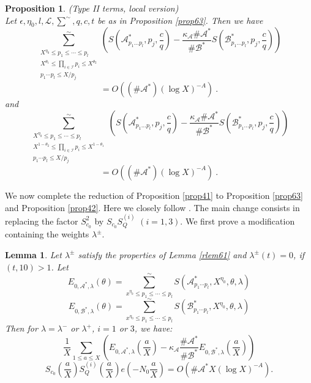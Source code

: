 \documentclass{amsart}
\newtheorem{lemma}[theorem]{Lemma}
\newtheorem{proposition}[theorem]{Proposition}
\numberwithin{equation}{subsection}
\begin{document}
\begin{proposition}\label{prop64}(Type II terms, local version)\\
Let $\epsilon, \eta_0, l, \mathcal{L}, \sum^\sim, q, c, t$ be as in Proposition \ref{prop63}. Then we have
$$\sum^\sim_{\substack{X^{\eta_0}\leq p_1\leq \cdots \leq p_l \\ X^{\theta_1}\leq \prod_{i\in \mathcal{I}} p_i\leq X^{\theta_2}\\ p_1\cdots p_l\leq X/p_j}} \left( S\left(\mathcal{A}^*_{p_1 \ldots p_l}, p_j, \frac{c}{q}\right)-\frac{\kappa_{\mathcal{A}}\#\mathcal{A}^*}{\#\mathcal{B}^*}  S\left(\mathcal{B}^*_{p_1 \ldots p_l}, p_j, \frac{c}{q}\right)  \right) $$
$$=O\left((\#\mathcal{A}^*)(\log X)^{-A}\right)\:.$$
and
$$\sum^\sim_{\substack{X^{\eta_0}\leq p_1\leq \cdots \leq p_l \\ X^{1-\theta_2}\leq \prod_{i\in \mathcal{I}} p_i\leq X^{1-\theta_1}\\ p_1\cdots p_l\leq X/p_j}} \left( S\left(\mathcal{A}^*_{p_1 \ldots p_l}, p_j, \frac{c}{q}\right)-\frac{\kappa_{\mathcal{A}}\#\mathcal{A}^*}{\#\mathcal{B}^*}  S\left(\mathcal{B}^*_{p_1 \ldots p_l}, p_j, \frac{c}{q}\right)  \right) $$
$$=O\left((\#\mathcal{A}^*)(\log X)^{-A}\right)\:.$$
\end{proposition}




We now complete the reduction of Proposition \ref{prop41} to Proposition \ref{prop63} and Proposition \ref{prop42}. Here we closely follow \cite{maier-rassias-gold}. The main change consists  in replacing the factor $S_{c_0}^2$ by $S_{c_0}S_{Q}^{(i)}$ $(i=1, 3)$. We first prove a modification containing the weights $\lambda^\pm$.




\begin{lemma}\label{rlem616}
Let $\lambda^\pm$ satisfy the properties of Lemma \ref{rlem61} and $\lambda^\pm(t)=0$, if \mbox{$(t, 10)>1$.} Let
$$E_{0, \mathcal{A}^*, \lambda}(\theta)=\sum_{x^{\eta_0}\leq p_1\leq \cdots \leq p_l}^\sim S(\mathcal{A}_{p_1\cdots p_l}^*, X^{\eta_0}, \theta, \lambda)$$
$$E_{0, \mathcal{B}^*, \lambda}(\theta)=\sum_{x^{\eta_0}\leq p_1\leq \cdots \leq p_l}^\sim S(\mathcal{B}_{p_1\cdots p_l}^*, X^{\eta_0}, \theta, \lambda)$$
Then for $\lambda=\lambda^-$ or $\lambda^+$, $i=1$ or $3$, we have:
$$\frac{1}{X}\sum_{1\leq a\leq X} \left( E_{0, \mathcal{A}^*, \lambda}\left(\frac{a}{X}\right)-\kappa_{\mathcal{A}}\frac{\#\mathcal{A}^*}{\#\mathcal{B}^*} E_{0, \mathcal{B}^*, \lambda}\left(\frac{a}{X}\right)\right)$$
$$S_{c_0}\left(\frac{a}{X}\right)S_Q^{(i)}\left(\frac{a}{X}\right)e\left(-N_0 \frac{a}{X}\right)=O\left(\# \mathcal{A}^* X(\log X)^{-A}  \right).$$
\end{lemma}
\end{document}
